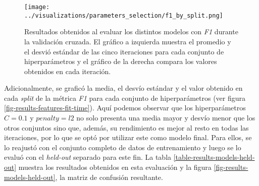 \begin{figure}[h!]
    \centering
    \texttt{[image: ../visualizations/parameters\_selection/f1\_by\_split.png]}
    \caption{Resultados obtenidos al evaluar los distintos modelos con
    \textit{F1} durante la validación cruzada. El gráfico a izquierda muestra el
    promedio y el desvió estándar de las cinco iteraciones para cada conjunto
    de hiperparámetros y el gráfico de la derecha compara los valores obtenidos en
    cada iteración.}
    \label{fig-results-models-f1}
\end{figure}

Adicionalmente, se graficó la media, el desvío estándar y el valor
obtenido en cada \textit{split} de la métrica \textit{F1}
para cada conjunto de hiperparámetros (ver figura \ref{fig-results-features-fit-time}).
Aquí podemos observar que los hiperparámetros $C=0.1$ y $penalty=l2$
no solo presenta una media mayor y desvío menor que los otros
conjuntos sino que, además, su rendimiento es mejor al resto en todas las
iteraciones, por lo que se optó por utilizar este como modelo final. Para ellos,
se lo reajustó con el conjunto completo de datos de entrenamiento y luego
se lo evaluó con el \textit{held-out} separado para este fin. La tabla
\ref{table-results-models-held-out} muestra los resultados obtenidos en
esta evaluación y la figura \ref{fig-results-models-held-out}, la matriz
de confusión resultante.

